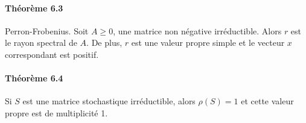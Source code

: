 \paragraph{Théorème 6.3} Perron-Frobenius. Soit $A\geq 0$, une matrice non négative irréductible. Alors $r$ est le rayon spectral de $A$. De plus, $r$ est une valeur propre simple et le vecteur $x$ correspondant est positif.

\paragraph{Théorème 6.4} Si $S$ est une matrice stochastique irréductible, alors $\rho(S) = 1$ et cette valeur propre est de multiplicité 1.


